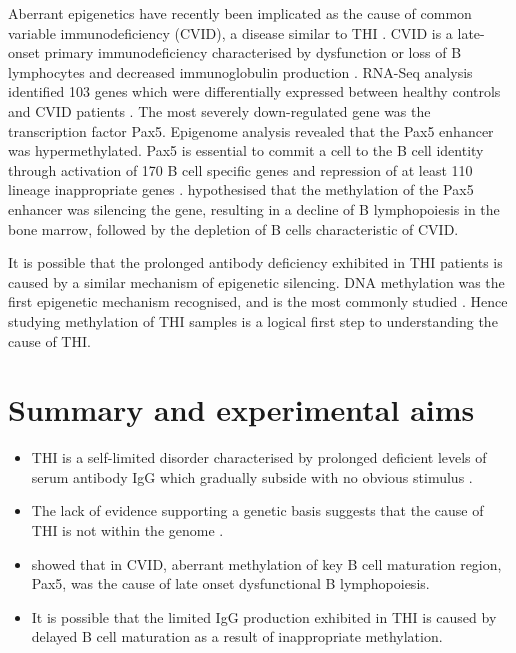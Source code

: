\documentclass[12pt]{article}
\begin{document}
			Aberrant epigenetics have recently been implicated as the cause of common variable immunodeficiency (CVID), a disease similar to THI \citep{Tallmadge15}.
			CVID is a late-onset primary immunodeficiency characterised by dysfunction or loss of B lymphocytes and decreased immunoglobulin production \citep{Cunningham-Rundles12}.
			RNA-Seq analysis identified 103 genes which were differentially expressed between healthy controls and CVID patients \citep{Tallmadge15}.
			The most severely down-regulated gene was the transcription factor Pax5.
			Epigenome analysis revealed that the Pax5 enhancer was hypermethylated.
			Pax5 is essential to commit a cell to the B cell identity through activation of 170 B cell specific genes and repression of at least 110 lineage inappropriate genes \citep{Schebesta07,Delogu06,Roessler07}.
			\citet{Tallmadge15} hypothesised that the methylation of the Pax5 enhancer was silencing the gene, resulting in a decline of B lymphopoiesis in the bone marrow, followed by the depletion of B cells characteristic of CVID.
			
			It is possible that the prolonged antibody deficiency exhibited in THI patients is caused by a similar mechanism of epigenetic silencing.
			DNA methylation was the first epigenetic mechanism recognised, and is the most commonly studied \citep{Begin14}.
			Hence studying methylation of THI samples is a logical first step to understanding the cause of THI.
		
	\section{Summary and experimental aims}

		\begin{mybox}
			
			\begin{itemize}

				\item THI is a self-limited disorder characterised by prolonged deficient levels of serum antibody IgG which gradually subside with no obvious stimulus \citep{Tiller78,Soothill68,Siegel81,McGeady87,Dressler89,Kowalczyk97,Dalal98,AlHerz14,Gitlin56,AlHerz11,Rosen66,Stiemh80,Buckley83}.
				\item The lack of evidence supporting a genetic basis suggests that the cause of THI is not within the genome \citep{Tiller78,Fiorilli86,Ovadia14}.
				\item \citet{Tallmadge15} showed that in CVID, aberrant methylation of key B cell maturation region, Pax5, was the cause of late onset dysfunctional B lymphopoiesis.
				\item It is possible that the limited IgG production exhibited in THI is caused by delayed B cell maturation as a result of inappropriate methylation.
				
			\end{itemize}

		\end{mybox}
\end{document}
